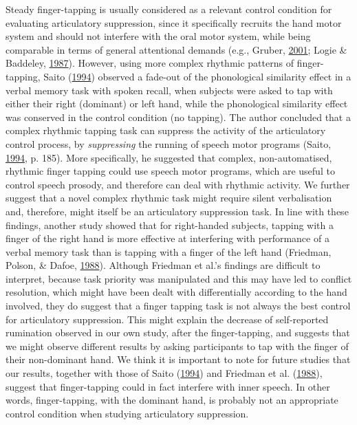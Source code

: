 \documentclass[a4paper,12pt,twoside,openright,oldfontcommands,final]{memoir}
\begin{document}
Steady finger-tapping is usually considered as a relevant control condition for evaluating articulatory suppression, since it specifically recruits the hand motor system and should not interfere with the oral motor system, while being comparable in terms of general attentional demands (e.g., Gruber, \protect\hyperlink{ref-gruber_effects_2001}{2001}; Logie \& Baddeley, \protect\hyperlink{ref-logie_cognitive_1987}{1987}). However, using more complex rhythmic patterns of finger-tapping, Saito (\protect\hyperlink{ref-saito_what_1994}{1994}) observed a fade-out of the phonological similarity effect in a verbal memory task with spoken recall, when subjects were asked to tap with either their right (dominant) or left hand, while the phonological similarity effect was conserved in the control condition (no tapping). The author concluded that a complex rhythmic tapping task can suppress the activity of the articulatory control process, by \emph{suppressing} the running of speech motor programs (Saito, \protect\hyperlink{ref-saito_what_1994}{1994}, p. 185). More specifically, he suggested that complex, non-automatised, rhythmic finger tapping could use speech motor programs, which are useful to control speech prosody, and therefore can deal with rhythmic activity. We further suggest that a novel complex rhythmic task might require silent verbalisation and, therefore, might itself be an articulatory suppression task. In line with these findings, another study showed that for right-handed subjects, tapping with a finger of the right hand is more effective at interfering with performance of a verbal memory task than is tapping with a finger of the left hand (Friedman, Polson, \& Dafoe, \protect\hyperlink{ref-friedman_dividing_1988}{1988}). Although Friedman et al.'s findings are difficult to interpret, because task priority was manipulated and this may have led to conflict resolution, which might have been dealt with differentially according to the hand involved, they do suggest that a finger tapping task is not always the best control for articulatory suppression. This might explain the decrease of self-reported rumination observed in our own study, after the finger-tapping, and suggests that we might observe different results by asking participants to tap with the finger of their non-dominant hand. We think it is important to note for future studies that our results, together with those of Saito (\protect\hyperlink{ref-saito_what_1994}{1994}) and Friedman et al. (\protect\hyperlink{ref-friedman_dividing_1988}{1988}), suggest that finger-tapping could in fact interfere with inner speech. In other words, finger-tapping, with the dominant hand, is probably not an appropriate control condition when studying articulatory suppression.
\end{document}
